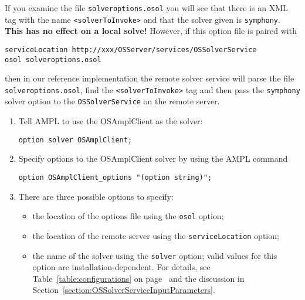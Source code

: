 If you examine the file {\tt solveroptions.osol} you will see that there is an XML tag  with the name
{\tt <solverToInvoke>} and that the solver given is {\tt symphony}.   
{\bf This has no effect on a local solve!} However, if this option file is paired with 

\begin{verbatim}
serviceLocation http://xxx/OSServer/services/OSSolverService
osol solveroptions.osol
\end{verbatim}
then in our reference implementation the remote solver service will parse the file {\tt solveroptions.osol}, find the {\tt <solverToInvoke>} tag and then pass the {\tt symphony} solver option to the {\tt OSSolverService} on the remote server.


\begin{enumerate}
\item Tell  AMPL to use the OSAmplClient as the solver:

\begin{verbatim}
option solver OSAmplClient;
\end{verbatim}

\item Specify options to the OSAmplClient solver by using the AMPL command 

\begin{verbatim}
option OSAmplClient_options "(option string)";
\end{verbatim}

\item There are three possible options to specify:

\begin{itemize}
\item the location of the options file using  the {\tt osol} option;

\item the location of the remote server using   the {\tt serviceLocation} option;

\item the name of the solver using the  {\tt solver} option; valid values for this option  are 
installation-dependent. 
For details, see Table~\ref{table:configurations} on page~\pageref{table:configurations} 
and the discussion in Section~\ref{section:OSSolverServiceInputParameters}. 

\end{itemize}


\end{enumerate}
